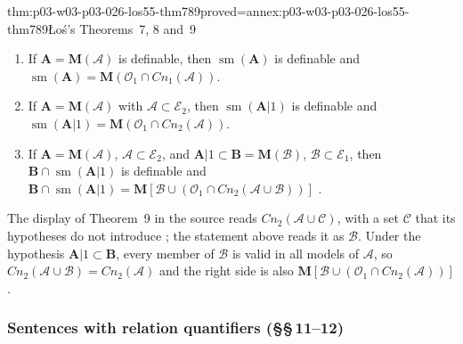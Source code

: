 \begin{hbtheorem}{thm:p03-w03-p03-026-los55-thm789}{proved=annex:p03-w03-p03-026-los55-thm789}{\L o\'s's Theorems~7, 8 and~9}
\begin{enumerate}
 \item[(Theorem~7)] If \(\mathbf A=\mathbf M(\mathcal A)\) is definable, then
       \(\operatorname{sm}(\mathbf A)\) is definable and
       \(\operatorname{sm}(\mathbf A)=\mathbf M(\mathcal O_1\cap\mathit{Cn}_1(\mathcal A))\).
 \item[(Theorem~8)] If \(\mathbf A=\mathbf M(\mathcal A)\) with
       \(\mathcal A\subset\mathcal E_2\), then
       \(\operatorname{sm}(\mathbf A|1)\) is definable and
       \(\operatorname{sm}(\mathbf A|1)=\mathbf M(\mathcal O_1\cap\mathit{Cn}_2(\mathcal A))\).
 \item[(Theorem~9)] If \(\mathbf A=\mathbf M(\mathcal A)\),
       \(\mathcal A\subset\mathcal E_2\), and
       \(\mathbf A|1\subset\mathbf B=\mathbf M(\mathcal B)\),
       \(\mathcal B\subset\mathcal E_1\), then
       \(\mathbf B\cap\operatorname{sm}(\mathbf A|1)\) is definable and
       \(\mathbf B\cap\operatorname{sm}(\mathbf A|1)
       =\mathbf M[\mathcal B\cup(\mathcal O_1\cap\mathit{Cn}_2(\mathcal A\cup\mathcal B))]\)
       \cite[p.~49]{Los1955}.
\end{enumerate}
\end{hbtheorem}

The display of Theorem~9 in the source reads
\(\mathit{Cn}_2(\mathcal A\cup\mathcal C)\), with a set \(\mathcal C\) that its
hypotheses do not introduce \cite[p.~49]{Los1955}; the statement above reads
it as \(\mathcal B\).  Under the hypothesis \(\mathbf A|1\subset\mathbf B\),
every member of \(\mathcal B\) is valid in all models of \(\mathcal A\), so
\(\mathit{Cn}_2(\mathcal A\cup\mathcal B)=\mathit{Cn}_2(\mathcal A)\) and the
right side is also
\(\mathbf M[\mathcal B\cup(\mathcal O_1\cap\mathit{Cn}_2(\mathcal A))]\).

\subsubsection{Sentences with relation quantifiers (\S\S\,11--12)}

